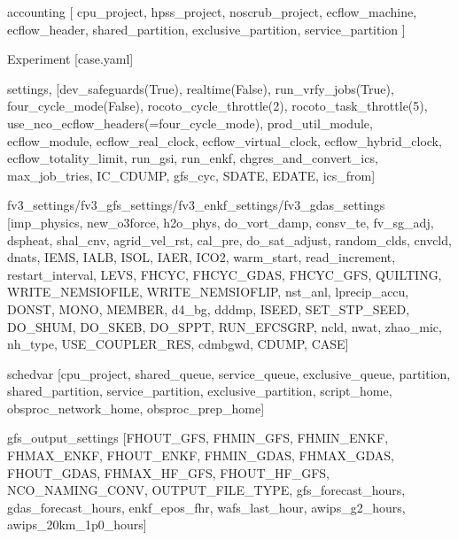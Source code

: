accounting \mbox{[} cpu\-\_\-project, hpss\-\_\-project, noscrub\-\_\-project, ecflow\-\_\-machine, ecflow\-\_\-header, shared\-\_\-partition, exclusive\-\_\-partition, service\-\_\-partition \mbox{]}

Experiment \mbox{[}case.\-yaml\mbox{]}

settings, \mbox{[}dev\-\_\-safeguards(\-True), realtime(\-False), run\-\_\-vrfy\-\_\-jobs(\-True), four\-\_\-cycle\-\_\-mode(\-False), rocoto\-\_\-cycle\-\_\-throttle(2), rocoto\-\_\-task\-\_\-throttle(5), use\-\_\-nco\-\_\-ecflow\-\_\-headers(=four\-\_\-cycle\-\_\-mode), prod\-\_\-util\-\_\-module, ecflow\-\_\-module, ecflow\-\_\-real\-\_\-clock, ecflow\-\_\-virtual\-\_\-clock, ecflow\-\_\-hybrid\-\_\-clock, ecflow\-\_\-totality\-\_\-limit, run\-\_\-gsi, run\-\_\-enkf, chgres\-\_\-and\-\_\-convert\-\_\-ics, max\-\_\-job\-\_\-tries, I\-C\-\_\-\-C\-D\-U\-M\-P, gfs\-\_\-cyc, S\-D\-A\-T\-E, E\-D\-A\-T\-E, ics\-\_\-from\mbox{]}

fv3\-\_\-settings/fv3\-\_\-gfs\-\_\-settings/fv3\-\_\-enkf\-\_\-settings/fv3\-\_\-gdas\-\_\-settings \mbox{[}imp\-\_\-physics, new\-\_\-o3force, h2o\-\_\-phys, do\-\_\-vort\-\_\-damp, consv\-\_\-te, fv\-\_\-sg\-\_\-adj, dspheat, shal\-\_\-cnv, agrid\-\_\-vel\-\_\-rst, cal\-\_\-pre, do\-\_\-sat\-\_\-adjust, random\-\_\-clds, cnvcld, dnats, I\-E\-M\-S, I\-A\-L\-B, I\-S\-O\-L, I\-A\-E\-R, I\-C\-O2, warm\-\_\-start, read\-\_\-increment, restart\-\_\-interval, L\-E\-V\-S, F\-H\-C\-Y\-C, F\-H\-C\-Y\-C\-\_\-\-G\-D\-A\-S, F\-H\-C\-Y\-C\-\_\-\-G\-F\-S, Q\-U\-I\-L\-T\-I\-N\-G, W\-R\-I\-T\-E\-\_\-\-N\-E\-M\-S\-I\-O\-F\-I\-L\-E, W\-R\-I\-T\-E\-\_\-\-N\-E\-M\-S\-I\-O\-F\-L\-I\-P, nst\-\_\-anl, lprecip\-\_\-accu, D\-O\-N\-S\-T, M\-O\-N\-O, M\-E\-M\-B\-E\-R, d4\-\_\-bg, dddmp, I\-S\-E\-E\-D, S\-E\-T\-\_\-\-S\-T\-P\-\_\-\-S\-E\-E\-D, D\-O\-\_\-\-S\-H\-U\-M, D\-O\-\_\-\-S\-K\-E\-B, D\-O\-\_\-\-S\-P\-P\-T, R\-U\-N\-\_\-\-E\-F\-C\-S\-G\-R\-P, ncld, nwat, zhao\-\_\-mic, nh\-\_\-type, U\-S\-E\-\_\-\-C\-O\-U\-P\-L\-E\-R\-\_\-\-R\-E\-S, cdmbgwd, C\-D\-U\-M\-P, C\-A\-S\-E\mbox{]}

schedvar \mbox{[}cpu\-\_\-project, shared\-\_\-queue, service\-\_\-queue, exclusive\-\_\-queue, partition, shared\-\_\-partition, service\-\_\-partition, exclusive\-\_\-partition, script\-\_\-home, obsproc\-\_\-network\-\_\-home, obsproc\-\_\-prep\-\_\-home\mbox{]}

gfs\-\_\-output\-\_\-settings \mbox{[}F\-H\-O\-U\-T\-\_\-\-G\-F\-S, F\-H\-M\-I\-N\-\_\-\-G\-F\-S, F\-H\-M\-I\-N\-\_\-\-E\-N\-K\-F, F\-H\-M\-A\-X\-\_\-\-E\-N\-K\-F, F\-H\-O\-U\-T\-\_\-\-E\-N\-K\-F, F\-H\-M\-I\-N\-\_\-\-G\-D\-A\-S, F\-H\-M\-A\-X\-\_\-\-G\-D\-A\-S, F\-H\-O\-U\-T\-\_\-\-G\-D\-A\-S, F\-H\-M\-A\-X\-\_\-\-H\-F\-\_\-\-G\-F\-S, F\-H\-O\-U\-T\-\_\-\-H\-F\-\_\-\-G\-F\-S, N\-C\-O\-\_\-\-N\-A\-M\-I\-N\-G\-\_\-\-C\-O\-N\-V, O\-U\-T\-P\-U\-T\-\_\-\-F\-I\-L\-E\-\_\-\-T\-Y\-P\-E, gfs\-\_\-forecast\-\_\-hours, gdas\-\_\-forecast\-\_\-hours, enkf\-\_\-epos\-\_\-fhr, wafs\-\_\-last\-\_\-hour, awips\-\_\-g2\-\_\-hours, awips\-\_\-20km\-\_\-1p0\-\_\-hours\mbox{]}


